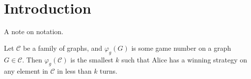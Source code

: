 \chapter{Introduction}
A note on notation.

    Let $\mathcal{C}$ be a family of graphs, and $\varphi_g(G)$ is some game number on a graph $G \in \mathcal{C}$. Then $\varphi_g(\mathcal{C})$ is the smallest $k$ such that Alice has a winning strategy on any element in $\mathcal{C}$ in less than $k$ turns.
    
    
